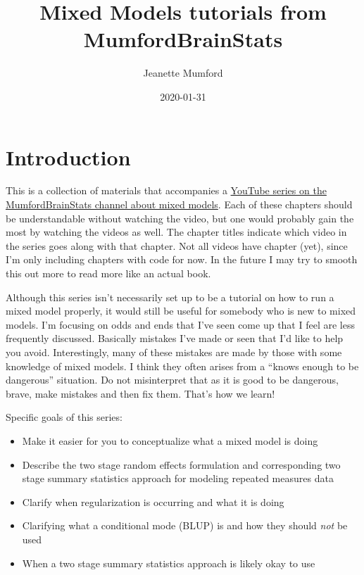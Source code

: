 \documentclass[
]{book}
\title{Mixed Models tutorials from MumfordBrainStats}
\author{Jeanette Mumford}
\date{2020-01-31}
\providecommand{\tightlist}{%
  \setlength{\itemsep}{0pt}\setlength{\parskip}{0pt}}
\begin{document}
\maketitle

{
\setcounter{tocdepth}{1}
\tableofcontents
}
\hypertarget{introduction}{%
\chapter*{Introduction}\label{introduction}}

This is a collection of materials that accompanies a \href{https://www.youtube.com/watch?v=IGHm1XHFWMc\&list=PLB2iAtgpI4YEAUiEQ1ZnfMXY-yewNzn9z}{YouTube series on the MumfordBrainStats channel about mixed models}. Each of these chapters should be understandable without watching the video, but one would probably gain the most by watching the videos as well. The chapter titles indicate which video in the series goes along with that chapter. Not all videos have chapter (yet), since I'm only including chapters with code for now. In the future I may try to smooth this out more to read more like an actual book.

Although this series isn't necessarily set up to be a tutorial on how to run a mixed model properly, it would still be useful for somebody who is new to mixed models. I'm focusing on odds and ends that I've seen come up that I feel are less frequently discussed. Basically mistakes I've made or seen that I'd like to help you avoid. Interestingly, many of these mistakes are made by those with some knowledge of mixed models. I think they often arises from a ``knows enough to be dangerous'' situation. Do not misinterpret that as it is good to be dangerous, brave, make mistakes and then fix them. That's how we learn!

Specific goals of this series:

\begin{itemize}
\tightlist
\item
  Make it easier for you to conceptualize what a mixed model is doing
\item
  Describe the two stage random effects formulation and corresponding two stage summary statistics approach for modeling repeated measures data
\item
  Clarify when regularization is occurring and what it is doing
\item
  Clarifying what a conditional mode (BLUP) is and how they should \emph{not} be used
\item
  When a two stage summary statistics approach is likely okay to use
\end{itemize}
\end{document}
